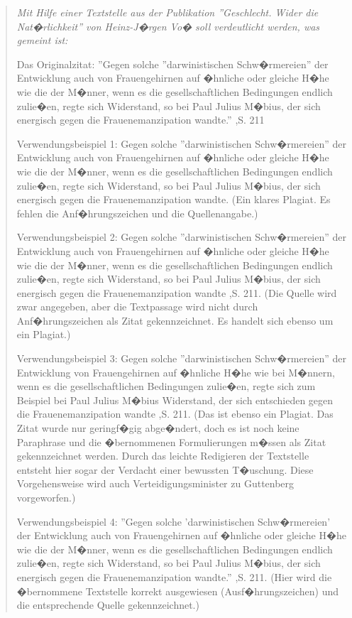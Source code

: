 \begin{quote}\rmfamily\small\itshape
Mit Hilfe einer Textstelle aus der Publikation ''Geschlecht. Wider die Nat�rlichkeit'' von Heinz-J�rgen Vo� soll verdeutlicht werden, was gemeint ist:

Das Originalzitat: ''Gegen solche ''darwinistischen Schw�rmereien'' der Entwicklung auch von Frauengehirnen auf �hnliche oder gleiche H�he wie die der M�nner, wenn es die gesellschaftlichen Bedingungen endlich zulie�en, regte sich Widerstand, so bei Paul Julius M�bius, der sich energisch gegen die Frauenemanzipation wandte.'' \cite{Voss2011},S. 211

Verwendungsbeispiel 1: Gegen solche ''darwinistischen Schw�rmereien'' der Entwicklung auch von Frauengehirnen auf �hnliche oder gleiche H�he wie die der M�nner, wenn es die gesellschaftlichen Bedingungen endlich zulie�en, regte sich Widerstand, so bei Paul Julius M�bius, der sich energisch gegen die Frauenemanzipation wandte. (Ein klares Plagiat. Es fehlen die Anf�hrungszeichen und die Quellenangabe.)


Verwendungsbeispiel 2: Gegen solche ''darwinistischen Schw�rmereien'' der Entwicklung auch von Frauengehirnen auf �hnliche oder gleiche H�he wie die der M�nner, wenn es die gesellschaftlichen Bedingungen endlich zulie�en, regte sich Widerstand, so bei Paul Julius M�bius, der sich energisch gegen die Frauenemanzipation wandte \cite{Voss2011},S. 211. (Die Quelle wird zwar angegeben, aber die Textpassage wird nicht durch Anf�hrungszeichen als Zitat gekennzeichnet. Es handelt sich ebenso um ein Plagiat.)

Verwendungsbeispiel 3: Gegen solche ''darwinistischen Schw�rmereien'' der Entwicklung von Frauengehirnen auf �hnliche H�he wie bei M�nnern, wenn es die gesellschaftlichen Bedingungen zulie�en, regte sich zum Beispiel bei Paul Julius M�bius Widerstand, der sich entschieden gegen die Frauenemanzipation wandte \cite{Voss2011},S. 211. (Das ist ebenso ein Plagiat. Das Zitat wurde nur geringf�gig abge�ndert, doch es ist noch keine Paraphrase und die �bernommenen Formulierungen m�ssen als Zitat gekennzeichnet werden. Durch das leichte Redigieren der Textstelle entsteht hier sogar der Verdacht einer bewussten T�uschung. Diese Vorgehensweise wird auch Verteidigungsminister zu Guttenberg vorgeworfen.)

Verwendungsbeispiel 4: ''Gegen solche 'darwinistischen Schw�rmereien' der Entwicklung auch von Frauengehirnen auf �hnliche oder gleiche H�he wie die der M�nner, wenn es die gesellschaftlichen Bedingungen endlich zulie�en, regte sich Widerstand, so bei Paul Julius M�bius, der sich energisch gegen die Frauenemanzipation wandte.'' \cite{Voss2011},S. 211. (Hier wird die �bernommene Textstelle korrekt ausgewiesen (Ausf�hrungszeichen) und die entsprechende Quelle gekennzeichnet.)


\end{quote}
